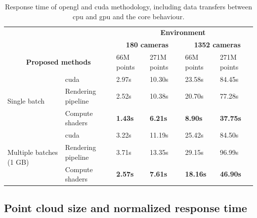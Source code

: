 \renewcommand{\arraystretch}{1.3}
\begin{table}[hb]
\centering
\caption{Response time of \acrshort{opengl} and \acrshort{cuda} methodology, including data transfers between \acrshort{cpu} and \acrshort{gpu} and the core behaviour.}
\label{table:cuda_opengl_occlusion_response_time}
\begin{tabular}{llllll}
    \toprule
    \multicolumn{2}{c}{} & \multicolumn{4}{c}{\textbf{Environment}} \\
    \cmidrule{3-6}
    \multicolumn{2}{c}{} & \multicolumn{2}{c}{\textbf{180 cameras}} & \multicolumn{2}{c}{\textbf{1352 cameras}}\\
    \cmidrule{3-6}
    \multicolumn{2}{c}{\textbf{Proposed methods}} & 66M points & 271M points & 66M points & 271M points\\
    \midrule
    \multirow{3}{*}{Single batch} & \acrshort{cuda} & 2.97s & 10.30s & 23.58s & 84.45s\\
    & Rendering pipeline & 2.52s & 10.38s & 20.70s & 77.28s\\
    & Compute shaders & \textbf{1.43s} & \textbf{6.21s} & \textbf{8.90s} & \textbf{37.75s}\\
    \hline
    \multirow{3}{*}{Multiple batches (1 GB)} & \acrshort{cuda} & 3.22s & 11.19s & 25.42s & 84.50s\\
    & Rendering pipeline & 3.71s & 13.35s & 29.15s & 96.99s\\
    & Compute shaders & \textbf{2.57s} & \textbf{7.61s} & \textbf{18.16s} & \textbf{46.90s}\\
    \bottomrule
\end{tabular}
\end{table}
\renewcommand{\arraystretch}{1}


\subsection{Point cloud size and normalized response time}

